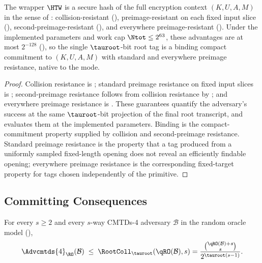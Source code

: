 \begin{corollary}
\label{cor:tag-commitment}
The wrapper $\HTW$ is a secure hash of the full encryption context
$(K, U, A, M)$ in the sense of \cite{RS04}: collision-resistant
(), preimage-resistant on each fixed input slice
(), second-preimage-resistant
(), and everywhere preimage-resistant
(). Under the implemented
parameters and work cap $\Ntot \leq 2^{63}$, these advantages are at most
$2^{-128}$ (), so the single $\tauroot$-bit
root tag is a binding compact commitment to $(K, U, A, M)$ with standard and
everywhere preimage resistance, native to the mode.
\end{corollary}

\begin{proof}
Collision resistance is ; standard preimage resistance on
fixed input slices is ; second-preimage resistance follows from
collision resistance by ; and everywhere
preimage resistance is . These guarantees quantify the
adversary's success at the same $\tauroot$-bit projection of the final root
transcript, and  evaluates them at the
implemented parameters. Binding is the compact-commitment property supplied
by collision and second-preimage resistance. Standard preimage resistance is
the property that a tag produced from a uniformly sampled fixed-length
opening does not reveal an efficiently findable opening; everywhere preimage
resistance is the corresponding fixed-target property for tags chosen
independently of the primitive.
\end{proof}

\subsection{Committing Consequences}

\begin{theorem}
\label{thm:cmtds4-ro}
For every $s \geq 2$ and every $s$-way CMTDs-4
adversary $\mathcal{B}$ in the \TW{} random oracle model
(),
\[
  \Advcmtds{4}_\RO(\mathcal{B})
  \;\leq\; \RootColl_{\tauroot}(\qRO(\mathcal{B}), s)
  = \frac{\binom{\qRO(\mathcal{B}) + s}{s}}{2^{\tauroot (s - 1)}}.
\]
\end{theorem}

